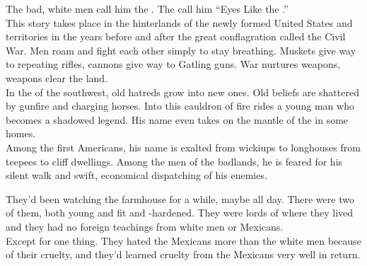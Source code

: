 
\label{album:eyes-like-the-sky}





The bad, white men call him the . The  call him ``Eyes Like the .'' \\

This story takes place in the hinterlands of the newly formed United States and territories in the years before and after the great conflagration called the Civil War. Men roam and fight each other simply to stay breathing. Muskets give way to repeating rifles, cannons give way to Gatling guns. War nurtures weapons, weapons clear the land. \\

In the  of the southwest, old hatreds grow into new ones. Old beliefs are shattered by gunfire and charging horses. Into this cauldron of fire rides a young man who becomes a shadowed legend. His name even takes on the mantle of the  in some homes. \\

Among the first Americans, his name is exalted from wickiups to longhouses from teepees to cliff dwellings. Among the men of the badlands, he is feared for his silent walk and swift, economical dispatching of his enemies. \\





They'd been watching the farmhouse for a while, maybe all day. There were two of them, both young and fit and -hardened. They were lords of where they lived and they had no foreign teachings from white men or Mexicans. \\

Except for one thing. They hated the Mexicans more than the white men because of their cruelty, and they'd learned cruelty from the Mexicans very well in return. \\

